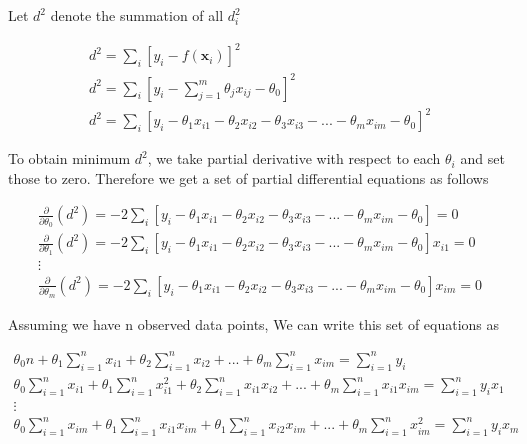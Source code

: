 \documentclass[english]{tktltiki}
\begin{document}
Let $d^2$ denote the summation of all $d^2_i$

\begin{eqnarray}
d^2 = \sum_i[y_i - f(\mathbf{x}_i)]^2 \nonumber\\
d^2 = \sum_i[y_i - \sum_{j=1}^m \theta_j x_{ij} - \theta_0]^2 \nonumber\\
d^2 = \sum_i[y_i - \theta_1x_{i1} - \theta_2x_{i2} - \theta_3x_{i3} - ... - \theta_mx_{im} - \theta_0]^2
\end{eqnarray}

To obtain minimum $d^2$, we take partial derivative with respect to each $\theta_i$ and set those to zero. Therefore we get a set of partial differential equations as follows

\begin{eqnarray}
\frac{\partial}{\partial{\theta_0}}(d^2) = -2\sum_i[y_i - \theta_1x_{i1} - \theta_2x_{i2} - \theta_3x_{i3} - ... - \theta_mx_{im} - \theta_0] = 0\nonumber \\
\frac{\partial}{\partial{\theta_1}}(d^2) = -2\sum_i[y_i - \theta_1x_{i1} - \theta_2x_{i2} - \theta_3x_{i3} - ... - \theta_mx_{im} - \theta_0]x_{i1} = 0\nonumber \\
\vdots \nonumber \\
\frac{\partial}{\partial{\theta_m}}(d^2) = -2\sum_i[y_i - \theta_1x_{i1} - \theta_2x_{i2} - \theta_3x_{i3} - ... - \theta_mx_{im} - \theta_0]x_{im} = 0
\end{eqnarray}

Assuming we have n observed data points, We can write this set of equations as

\begin{eqnarray}
\theta_0 n + \theta_1 \sum_{i=1}^n x_{i1} + \theta_2 \sum_{i=1}^n x_{i2} + ... + \theta_m \sum_{i=1}^n x_{im} = \sum_{i=1}^n y_i \nonumber \\
\theta_0 \sum_{i=1}^n x_{i1} + \theta_1 \sum_{i=1}^n x_{i1}^2 + \theta_2 \sum_{i=1}^n x_{i1} x_{i2} +  ... + \theta_m \sum_{i=1}^n x_{i1} x_{im} = \sum_{i=1}^n y_i x_1 \nonumber \\
\vdots \nonumber \\
\theta_0 \sum_{i=1}^n x_{im} + \theta_1 \sum_{i=1}^n x_{i1} x_{im} + \theta_1 \sum_{i=1}^n x_{i2} x_{im} + ... + \theta_m \sum_{i=1}^n x_{im}^2 = \sum_{i=1}^n y_i x_m
\end{eqnarray}
\end{document}
